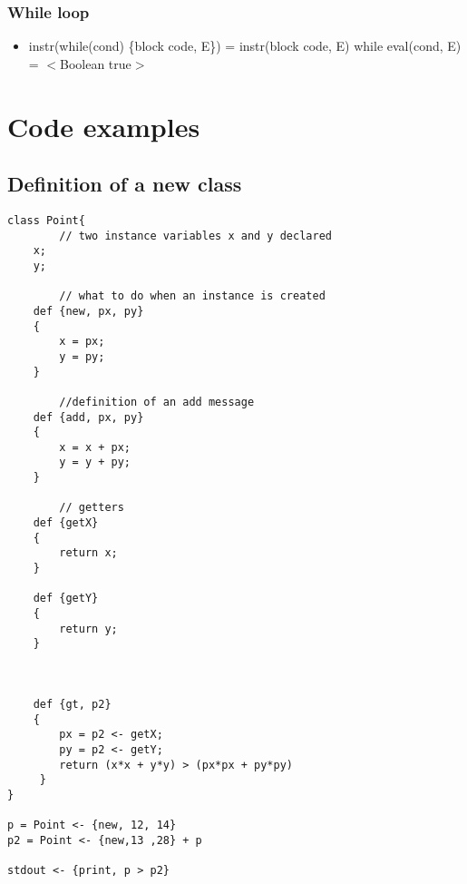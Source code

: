 \documentclass{eplDoc}
\begin{document}
\subsubsection{While loop}

\begin{itemize}
	\item instr(while(cond) \{block code, E\}) = instr(block code, E) while eval(cond, E) = $<$Boolean true$>$
     
                       
\end{itemize}

\section{Code examples}

\subsection{Definition of a new class}
\begin{lstlisting}
class Point{
		// two instance variables x and y declared
    x;
    y;

		// what to do when an instance is created
    def {new, px, py}
    {
        x = px;
        y = py;
    }
		
		//definition of an add message
    def {add, px, py}
    {
        x = x + px;
        y = y + py;
    }

		// getters
    def {getX}
    {
        return x;    
    }
    
    def {getY}
    {
        return y;    
    }
		
		
		
    def {gt, p2}
    {
        px = p2 <- getX;    
        py = p2 <- getY;    
        return (x*x + y*y) > (px*px + py*py)
     }
}

p = Point <- {new, 12, 14}
p2 = Point <- {new,13 ,28} + p

stdout <- {print, p > p2}

\end{lstlisting}
\end{document}
